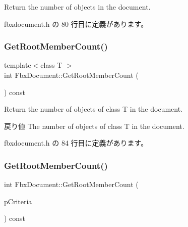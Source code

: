 Return the number of objects in the document. 



 fbxdocument.\+h の 80 行目に定義があります。

\mbox{\label{class_fbx_document_a947d3939526793022b921298efae1660}} 
\subsubsection{\texorpdfstring{Get\+Root\+Member\+Count()}{GetRootMemberCount()}\hspace{0.1cm}{\footnotesize\ttfamily [2/3]}}
{\footnotesize\ttfamily template$<$class T $>$ \\
int Fbx\+Document\+::\+Get\+Root\+Member\+Count (\begin{DoxyParamCaption}{ }\end{DoxyParamCaption}) const\hspace{0.3cm}{\ttfamily [inline]}}

Return the number of objects of class T in the document. \begin{DoxyReturn}{戻り値}
The number of objects of class T in the document. 
\end{DoxyReturn}


 fbxdocument.\+h の 84 行目に定義があります。

\mbox{\label{class_fbx_document_a9befeca0b093870eb1df0b5dbe23fc0a}} 
\subsubsection{\texorpdfstring{Get\+Root\+Member\+Count()}{GetRootMemberCount()}\hspace{0.1cm}{\footnotesize\ttfamily [3/3]}}
{\footnotesize\ttfamily int Fbx\+Document\+::\+Get\+Root\+Member\+Count (\begin{DoxyParamCaption}\item[{\hyperlink{class_fbx_criteria}{Fbx\+Criteria}}]{p\+Criteria }\end{DoxyParamCaption}) const}

